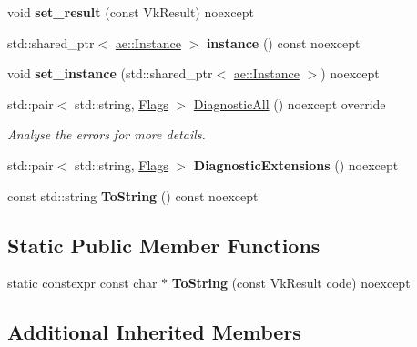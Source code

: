 \begin{DoxyCompactItemize}
void {\bfseries set\+\_\+result} (const Vk\+Result) noexcept
\item 
\hypertarget{classae_1_1error_1_1_vulkan_afac81cd635b46ad469318baf188c3087}{}\label{classae_1_1error_1_1_vulkan_afac81cd635b46ad469318baf188c3087} 
std\+::shared\+\_\+ptr$<$ \hyperlink{classae_1_1_instance}{ae\+::\+Instance} $>$ {\bfseries instance} () const noexcept
\item 
\hypertarget{classae_1_1error_1_1_vulkan_ad1510646a855a9ea04995005f50cb942}{}\label{classae_1_1error_1_1_vulkan_ad1510646a855a9ea04995005f50cb942} 
void {\bfseries set\+\_\+instance} (std\+::shared\+\_\+ptr$<$ \hyperlink{classae_1_1_instance}{ae\+::\+Instance} $>$) noexcept
\item 
std\+::pair$<$ std\+::string, \hyperlink{structae_1_1error_1_1_flags}{Flags} $>$ \hyperlink{classae_1_1error_1_1_vulkan_a1446494fd8ab1b5fc4b9ca8c27b37e8a}{Diagnostic\+All} () noexcept override
\begin{DoxyCompactList}\small\item\em Analyse the errors for more details. \end{DoxyCompactList}\item 
\hypertarget{classae_1_1error_1_1_vulkan_afbd41741c757cafc7820f02160aabe71}{}\label{classae_1_1error_1_1_vulkan_afbd41741c757cafc7820f02160aabe71} 
std\+::pair$<$ std\+::string, \hyperlink{structae_1_1error_1_1_flags}{Flags} $>$ {\bfseries Diagnostic\+Extensions} () noexcept
\item 
\hypertarget{classae_1_1error_1_1_vulkan_a109571247205dc718536bee23fcc73fa}{}\label{classae_1_1error_1_1_vulkan_a109571247205dc718536bee23fcc73fa} 
const std\+::string {\bfseries To\+String} () const noexcept
\end{DoxyCompactItemize}
\subsection*{Static Public Member Functions}
\begin{DoxyCompactItemize}
\item 
\hypertarget{classae_1_1error_1_1_vulkan_a24ca72c930ec058158c45bda7612a3eb}{}\label{classae_1_1error_1_1_vulkan_a24ca72c930ec058158c45bda7612a3eb} 
static constexpr const char $\ast$ {\bfseries To\+String} (const Vk\+Result code) noexcept
\end{DoxyCompactItemize}
\subsection*{Additional Inherited Members}


